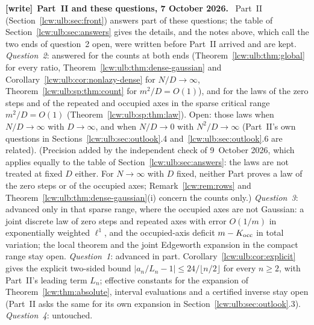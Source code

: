 \documentclass[11pt,letterpaper]{article}
\theoremstyle{remark}\newtheorem{remark}[theorem]{Remark}
\newenvironment{writenote}[1][]{\par\smallskip\begingroup\small
 \noindent\textbf{[write]}\if\relax\detokenize{#1}\relax\else~\textbf{#1.}\fi\ }%
 {\par\endgroup\smallskip}
\begin{document}
\begin{writenote}[Part~II and these questions, 7 October 2026]
Part~II (Section~\ref{lcw:ulb:sec:front}) answers part of these questions; the
table of Section~\ref{lcw:ulb:sec:answers} gives the details, and the notes
above, which call the two ends of question~2 open, were written before
Part~II arrived and are kept. \emph{Question~2}: answered for the counts at
both ends (Theorem~\ref{lcw:ulb:thm:global} for every ratio,
Theorem~\ref{lcw:ulb:thm:dense-gaussian} and
Corollary~\ref{lcw:ulb:cor:nonlazy-dense} for $N/D\to\infty$,
Theorem~\ref{lcw:ulb:sp:thm:count} for $m^2/D=O(1)$), and for the laws of
the zero steps and of the repeated and occupied axes in the sparse critical
range $m^2/D=O(1)$ (Theorem~\ref{lcw:ulb:sp:thm:law}). Open: those laws when
$N/D\to\infty$ with $D\to\infty$, and when $N/D\to0$ with $N^2/D\to\infty$
(Part~II's own questions in
Sections~\ref{lcw:ulb:sec:outlook}.4 and~\ref{lcw:ulb:sec:outlook}.6 are
related). \textup{(Precision added by the independent check of 9~October
2026, which applies equally to the table of
Section~\ref{lcw:ulb:sec:answers}: the laws are not treated at fixed $D$
either. For $N\to\infty$ with $D$ fixed, neither Part proves a law of the
zero steps or of the occupied axes; Remark~\ref{lcw:rem:rows} and
Theorem~\ref{lcw:ulb:thm:dense-gaussian}(i) concern the counts only.)} \emph{Question~3}: advanced only in that sparse range, where the
occupied axes are not Gaussian: a joint discrete law of zero steps and
repeated axes with error $O(1/m)$ in exponentially weighted $\ell^1$, and the
occupied-axis deficit $m-K_{\rm occ}$ in total variation; the local theorem
and the joint Edgeworth expansion in the compact range stay open.
\emph{Question~1}: advanced in part. Corollary~\ref{lcw:ulb:cor:explicit}
gives the explicit two-sided bound $|a_n/L_n-1|\le24/\lfloor n/2\rfloor$ for
every $n\ge2$, with Part~II's leading term $L_n$; effective constants for
the expansion of Theorem~\ref{lcw:thm:absolute}, interval evaluations and a
certified inverse stay open (Part~II asks the same for its own expansion in
Section~\ref{lcw:ulb:sec:outlook}.3). \emph{Question~4}: untouched.
\end{writenote}

\clearpage
\end{document}
